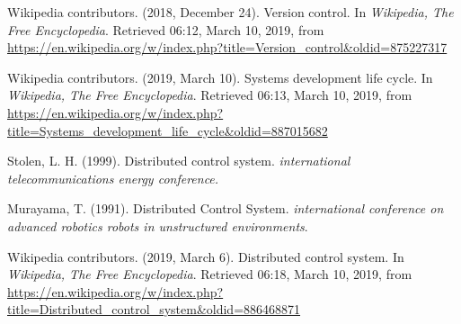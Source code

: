 \documentclass[a4paper]{report}
\begin{document}
\begin{thebibliography}{A}

Wikipedia contributors. (2018, December 24). Version control. In \emph{Wikipedia, The Free Encyclopedia}. Retrieved 06:12, March 10, 2019, from \url{https://en.wikipedia.org/w/index.php?title=Version_control&oldid=875227317}

Wikipedia contributors. (2019, March 10). Systems development life cycle. In \emph{Wikipedia, The Free Encyclopedia}. Retrieved 06:13, March 10, 2019, from \url{https://en.wikipedia.org/w/index.php?title=Systems_development_life_cycle&oldid=887015682}

Stolen, L. H. (1999). Distributed control system. \emph{international telecommunications energy conference.}

Murayama, T. (1991). Distributed Control System. \emph{international conference on advanced robotics robots in unstructured environments}.

Wikipedia contributors. (2019, March 6). Distributed control system. In \emph{Wikipedia, The Free Encyclopedia}. Retrieved 06:18, March 10, 2019, from \url{https://en.wikipedia.org/w/index.php?title=Distributed_control_system&oldid=886468871}

\end{thebibliography}
\end{document}
